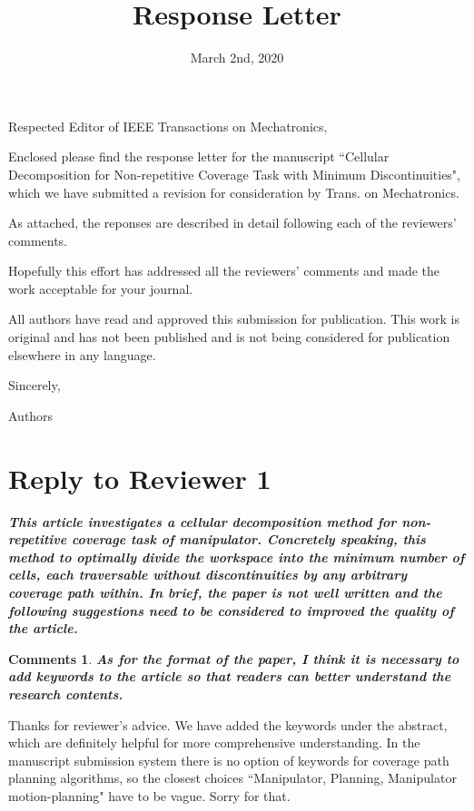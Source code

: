\documentclass[utf8]{article}
\title{Response Letter}
\date{March 2nd, 2020}
\newtheorem{theorem}{Comments}[section]
\begin{document}
\thispagestyle{empty}
\maketitle
\noindent
Respected Editor of IEEE Transactions on Mechatronics, 

Enclosed please find the response letter for the manuscript ``Cellular Decomposition for Non-repetitive Coverage Task with Minimum Discontinuities", which we have submitted a revision for consideration by Trans. on Mechatronics. 

As attached, the reponses are described in detail following each of the reviewers' comments. 

Hopefully this effort has addressed all the reviewers' comments and made the work acceptable for your journal. 

All authors have read and approved this submission for publication. This work is original and has not been published and is not being considered for publication elsewhere in any language. 

\noindent
Sincerely, 

\noindent
Authors

\newpage
\setcounter{page}{1}

\section{Reply to Reviewer 1}
\textbf{\textit{This article investigates a cellular decomposition method for non-repetitive coverage task of manipulator. Concretely speaking, this method to optimally divide the workspace into the minimum number of cells, each traversable without discontinuities by any arbitrary coverage path within. In brief, the paper is not well written and the following suggestions need to be considered to improved the quality of the article.} }

\begin{theorem}
\textbf{As for the format of the paper, I think it is necessary to add keywords to the article so that readers can better understand the research contents. }
\end{theorem}

Thanks for reviewer's advice. We have added the keywords under the abstract, which are definitely helpful for more comprehensive understanding. In the manuscript submission system there is no option of keywords for coverage path planning algorithms, so the closest choices ``Manipulator, Planning, Manipulator motion-planning" have to be vague. Sorry for that. 
\end{document}
